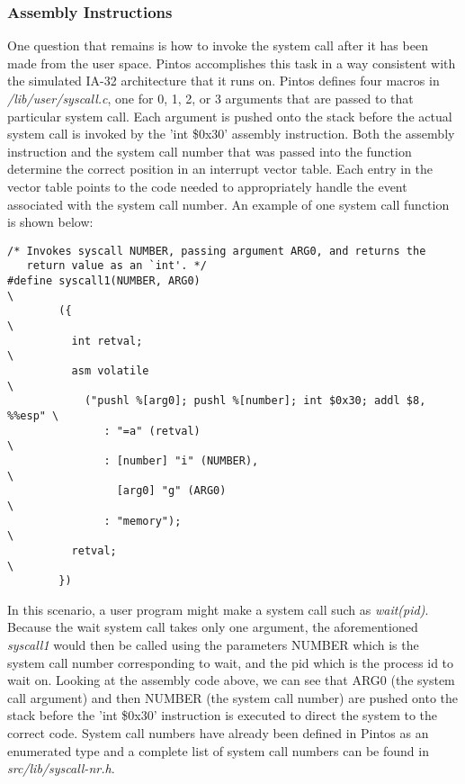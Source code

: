 \documentclass[11pt, letterpaper]{article}
\begin{document}
\subsubsection{Assembly Instructions}
One question that remains is how to invoke the system call after it has been made from the user space. Pintos accomplishes this task 
in a way consistent with the simulated IA-32 architecture that it runs on. Pintos defines four macros in \textit{/lib/user/syscall.c}, one for 0, 1, 2, or 3 arguments that are passed to that particular system 
call. Each argument is pushed onto the stack before the actual system call is invoked by the 'int \$0x30' assembly instruction. Both the 
assembly instruction and the system call number that was passed into the function determine the correct position in an interrupt 
vector table. Each entry in the vector table points to the code needed to appropriately handle the event associated with the system
call number. An example of one system call function is shown below:
\begin{lstlisting}[frame=single,basicstyle=\footnotesize]
/* Invokes syscall NUMBER, passing argument ARG0, and returns the
   return value as an `int'. */
#define syscall1(NUMBER, ARG0)                                           \
        ({                                                               \
          int retval;                                                    \
          asm volatile                                                   \
            ("pushl %[arg0]; pushl %[number]; int $0x30; addl $8, %%esp" \
               : "=a" (retval)                                           \
               : [number] "i" (NUMBER),                                  \
                 [arg0] "g" (ARG0)                                       \
               : "memory");                                              \
          retval;                                                        \
        })
\end{lstlisting}

In this scenario, a user program might make a system call such as \textit{wait(pid)}. Because the wait system call takes only one 
argument, the aforementioned \textit{syscall1} would then be called using the parameters NUMBER which is the system call number 
corresponding to wait, and the pid which is the process id to wait on. Looking at the assembly code above, we can see that ARG0 
(the system call argument) and then NUMBER (the system call number) are pushed onto the stack before the 'int \$0x30' instruction 
is executed to direct the system to the correct code. System call numbers have already been defined in Pintos as an enumerated 
type and a complete list of system call numbers can be found in \textit{src/lib/syscall-nr.h}.
\end{document}
